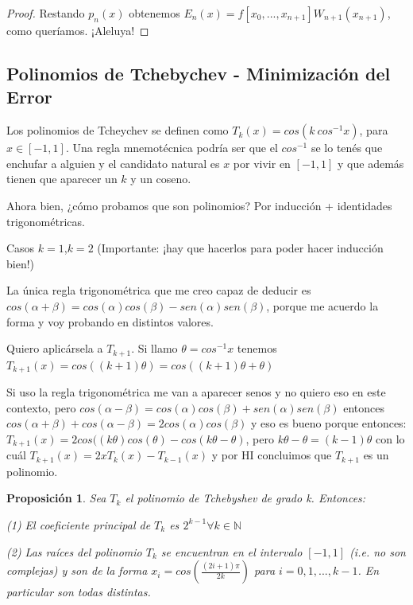 \documentclass[10pt,a4paper,final]{report}
\newtheorem{proposition}{Proposición}
\begin{document}
{\begin{proof}
Restando $p_n(x)$ obtenemos $E_n(x) = f[x_0,...,x_{n+1}]W_{n+1}(x_{n+1})$, como queríamos. ¡Aleluya!

\end{proof}

\subsection{Polinomios de Tchebychev - Minimización del Error}

Los polinomios de Tcheychev se definen como $T_k(x) = cos(k\ cos^{-1}x)$, para $x\in[-1,1]$. Una regla mnemotécnica podría ser que el $cos^{-1}$ se lo tenés que enchufar a alguien y el candidato natural es $x$ por vivir en $[-1,1]$ y que además tienen que aparecer un $k$ y un coseno.

Ahora bien, ¿cómo probamos que son polinomios? Por inducción + identidades trigonométricas.

Casos $k=1$,$k=2$ (Importante: ¡hay que hacerlos para poder hacer inducción bien!)

La única regla trigonométrica que me creo capaz de deducir es $cos(\alpha + \beta) = cos(\alpha) cos(\beta) - sen(\alpha) sen(\beta)$, porque me acuerdo la forma y voy probando en distintos valores.

Quiero aplicársela a $T_{k+1}$. Si llamo $\theta = cos^{-1}x$ tenemos $T_{k+1}(x) = cos((k+1)\theta) = cos((k+1)\theta + \theta)$

Si uso la regla trigonométrica me van a aparecer senos y no quiero eso en este contexto, pero $cos(\alpha - \beta) = cos(\alpha) cos(\beta) + sen(\alpha) sen(\beta)$ entonces $cos(\alpha + \beta) + cos(\alpha - \beta) = 2 cos(\alpha) cos(\beta)$ y eso es bueno porque entonces:\\

$T_{k+1}(x) = 2 cos((k \theta) cos(\theta) - cos(k \theta - \theta) $, pero $k \theta - \theta= (k-1) \theta$ con lo cuál $T_{k+1}(x) = 2x T_k(x) - T_{k-1}(x)$ y por HI concluimos que $T_{k+1}$ es un polinomio.


\begin{proposition}Sea $T_k$ el polinomio de Tchebyshev de grado k. Entonces:

(1) El coeficiente principal de $T_k$ es $2^{k-1} \forall k \in \mathbb{N}$

(2) Las raíces del polinomio $T_k$ se encuentran en el intervalo $[-1,1]$ (i.e. no son complejas) y son de la forma $x_i= cos(\frac{(2i+1)\pi}{2k})$ para $i=0,1,...,k-1$. En particular son todas distintas.


\end{proposition}}
\end{document}
